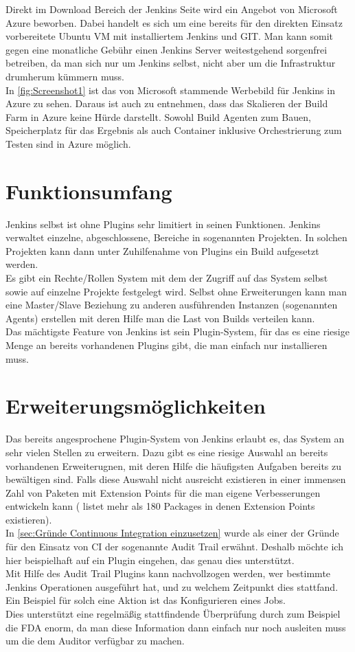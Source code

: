 Direkt im Download Bereich der Jenkins Seite wird ein Angebot von Microsoft Azure beworben. Dabei handelt es sich um eine bereits für den direkten Einsatz vorbereitete Ubuntu VM mit installiertem Jenkins und GIT. Man kann somit gegen eine monatliche Gebühr einen Jenkins Server weitestgehend sorgenfrei betreiben, da man sich nur um Jenkins selbst, nicht aber um die Infrastruktur drumherum kümmern muss. \cite{jenkins-azure}\\
In \autoref{fig:Screenshot1} ist das von Microsoft stammende Werbebild für Jenkins in Azure zu sehen. Daraus ist auch zu entnehmen, dass das Skalieren der Build Farm in Azure keine Hürde darstellt. Sowohl Build Agenten zum Bauen, Speicherplatz für das Ergebnis als auch Container inklusive Orchestrierung zum Testen sind in Azure möglich.
\section{Funktionsumfang}
Jenkins selbst ist ohne Plugins sehr limitiert in seinen Funktionen. Jenkins verwaltet einzelne, abgeschlossene, Bereiche in sogenannten Projekten. In solchen Projekten kann dann unter Zuhilfenahme von Plugins ein Build aufgesetzt werden.\\
Es gibt ein Rechte/Rollen System mit dem der Zugriff auf das System selbst sowie auf einzelne Projekte festgelegt wird. Selbst ohne Erweiterungen kann man eine Master/Slave Beziehung zu anderen ausführenden Instanzen (sogenannten Agents) erstellen mit deren Hilfe man die Last von Builds verteilen kann.\\
Das mächtigste Feature von Jenkins ist sein Plugin-System, für das es eine riesige Menge an bereits vorhandenen Plugins gibt, die man einfach nur installieren muss.
\section{Erweiterungsmöglichkeiten}
Das bereits angesprochene Plugin-System von Jenkins erlaubt es, das System an sehr vielen Stellen zu erweitern. Dazu gibt es eine riesige Auswahl an bereits vorhandenen Erweiterugnen, mit deren Hilfe die häufigsten Aufgaben bereits zu bewältigen sind. Falls diese Auswahl nicht ausreicht existieren in einer immensen Zahl von Paketen mit Extension Points für die man eigene Verbesserungen entwickeln kann (\cite{jenkins-extensionpoints} listet mehr als 180 Packages in denen Extension Points existieren).\\
In \autoref{sec:Gründe Continuous Integration einzusetzen} wurde als einer der Gründe für den Einsatz von CI der sogenannte Audit Trail erwähnt. Deshalb möchte ich hier beispielhaft auf ein Plugin eingehen, das genau dies unterstützt.\\
Mit Hilfe des Audit Trail Plugins kann nachvollzogen werden, wer bestimmte Jenkins Operationen ausgeführt hat, und zu welchem Zeitpunkt dies stattfand. Ein Beispiel für solch eine Aktion ist das Konfigurieren eines Jobs. \cite{jenkins-audit-trail}\\
Dies unterstützt eine regelmäßig stattfindende Überprüfung durch zum Beispiel die FDA enorm, da man diese Information dann einfach nur noch ausleiten muss um die dem Auditor verfügbar zu machen.
